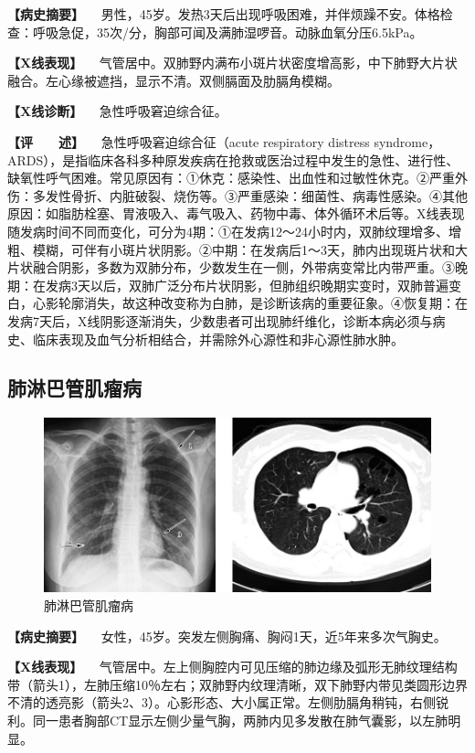 \textbf{【病史摘要】}
　男性，45岁。发热3天后出现呼吸困难，并伴烦躁不安。体格检查：呼吸急促，35次/分，胸部可闻及满肺湿啰音。动脉血氧分压6.5kPa。

\textbf{【X线表现】}
　气管居中。双肺野内满布小斑片状密度增高影，中下肺野大片状融合。左心缘被遮挡，显示不清。双侧膈面及肋膈角模糊。

\textbf{【X线诊断】} 　急性呼吸窘迫综合征。

\textbf{【评　　述】} 　急性呼吸窘迫综合征（acute respiratory distress
syndrome，ARDS），是指临床各科多种原发疾病在抢救或医治过程中发生的急性、进行性、缺氧性呼气困难。常见原因有：①休克：感染性、出血性和过敏性休克。②严重外伤：多发性骨折、内脏破裂、烧伤等。③严重感染：细菌性、病毒性感染。④其他原因：如脂肪栓塞、胃液吸入、毒气吸入、药物中毒、体外循环术后等。X线表现随发病时间不同而变化，可分为4期：①在发病12～24小时内，双肺纹理增多、增粗、模糊，可伴有小斑片状阴影。②中期：在发病后1～3天，肺内出现斑片状和大片状融合阴影，多数为双肺分布，少数发生在一侧，外带病变常比内带严重。③晚期：在发病3天以后，双肺广泛分布片状阴影，但肺组织晚期实变时，双肺普遍变白，心影轮廓消失，故这种改变称为白肺，是诊断该病的重要征象。④恢复期：在发病7天后，X线阴影逐渐消失，少数患者可出现肺纤维化，诊断本病必须与病史、临床表现及血气分析相结合，并需除外心源性和非心源性肺水肿。

\subsection{肺淋巴管肌瘤病}

\begin{figure}[!htbp]
 \centering
 \includegraphics{./images/Image00186.jpg}
 \captionsetup{justification=centering}
 \caption{肺淋巴管肌瘤病}
 \label{fig3-10-7}
  \end{figure} 

\textbf{【病史摘要】}
　女性，45岁。突发左侧胸痛、胸闷1天，近5年来多次气胸史。

\textbf{【X线表现】}
　气管居中。左上侧胸腔内可见压缩的肺边缘及弧形无肺纹理结构带（箭头1），左肺压缩10％左右；双肺野内纹理清晰，双下肺野内带见类圆形边界不清的透亮影（箭头2、3）。心影形态、大小属正常。左侧肋膈角稍钝，右侧锐利。同一患者胸部CT显示左侧少量气胸，两肺内见多发散在肺气囊影，以左肺明显。

